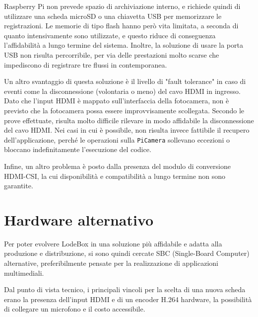 
Raspberry Pi non prevede spazio di archiviazione interno, e richiede quindi di utilizzare una scheda microSD o una chiavetta USB per memorizzare le registrazioni. Le memorie di tipo flash hanno però vita limitata, a seconda di quanto intensivamente sono utilizzate, e questo riduce di conseguenza l'affidabilità a lungo termine del sistema. Inoltre, la soluzione di usare la porta USB non risulta percorribile, per via delle prestazioni molto scarse che impediscono di registrare tre flussi in contemporanea.

Un altro svantaggio di questa soluzione è il livello di "fault tolerance" in caso di eventi come la disconnessione (volontaria o meno) del cavo HDMI in ingresso. Dato che l'input HDMI è mappato sull'interfaccia della fotocamera, non è previsto che la fotocamera possa essere improvvisamente scollegata. Secondo le prove effettuate, risulta molto difficile rilevare in modo affidabile la disconnessione del cavo HDMI. Nei casi in cui è possibile, non risulta invece fattibile il recupero dell'applicazione, perché le operazioni sulla \texttt{PiCamera} sollevano eccezioni o bloccano indefinitamente l'esecuzione del codice.

Infine, un altro problema è posto dalla presenza del modulo di conversione HDMI-CSI, la cui disponibilità e compatibilità a lungo termine non sono garantite.

\section{Hardware alternativo}
\label{sec:intro_hardware}

Per poter evolvere LodeBox in una soluzione più affidabile e adatta alla produzione e distribuzione, si sono quindi cercate SBC (Single-Board Computer) alternative, preferibilmente pensate per la realizzazione di applicazioni multimediali.

Dal punto di vista tecnico, i principali vincoli per la scelta di una nuova scheda erano la presenza dell'input HDMI e di un encoder H.264 hardware, la possibilità di collegare un microfono e il costo accessibile.


